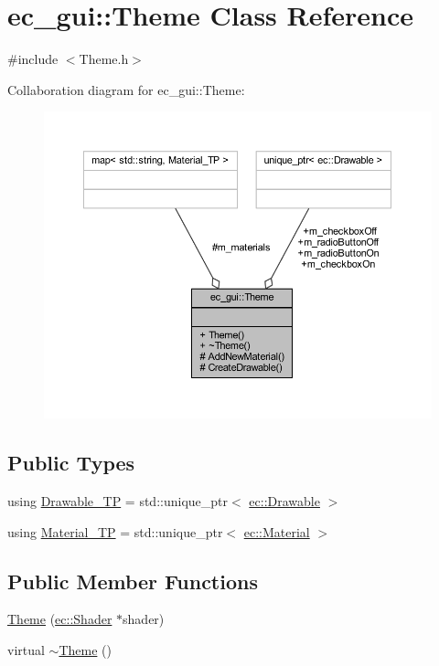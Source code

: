 \hypertarget{classec__gui_1_1_theme}{}\section{ec\+\_\+gui\+:\+:Theme Class Reference}
\label{classec__gui_1_1_theme}


{\ttfamily \#include $<$Theme.\+h$>$}



Collaboration diagram for ec\+\_\+gui\+:\+:Theme\+:\nopagebreak
\begin{figure}[H]
\begin{center}
\leavevmode
\includegraphics[width=350pt]{classec__gui_1_1_theme__coll__graph}
\end{center}
\end{figure}
\subsection*{Public Types}
\begin{DoxyCompactItemize}
\item 
using \mbox{\hyperlink{classec__gui_1_1_theme_a91d9c5c68bc50cc0f1470d141a6a231b}{Drawable\+\_\+\+TP}} = std\+::unique\+\_\+ptr$<$ \mbox{\hyperlink{classec_1_1_drawable}{ec\+::\+Drawable}} $>$
\item 
using \mbox{\hyperlink{classec__gui_1_1_theme_ad0272419db6e28fc59f972460e5260ad}{Material\+\_\+\+TP}} = std\+::unique\+\_\+ptr$<$ \mbox{\hyperlink{classec_1_1_material}{ec\+::\+Material}} $>$
\end{DoxyCompactItemize}
\subsection*{Public Member Functions}
\begin{DoxyCompactItemize}
\item 
\mbox{\hyperlink{classec__gui_1_1_theme_ad0a0cf74a37307bdb2cc12672f2649d4}{Theme}} (\mbox{\hyperlink{classec_1_1_shader}{ec\+::\+Shader}} $\ast$shader)
\item 
virtual \mbox{\hyperlink{classec__gui_1_1_theme_a49f870526859d679091067ee73e9881e}{$\sim$\+Theme}} ()
\end{DoxyCompactItemize}
